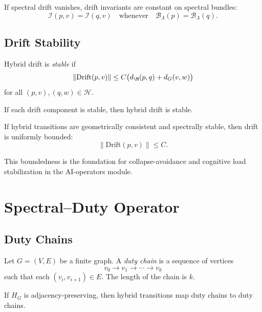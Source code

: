 \begin{theorem}
If spectral drift vanishes, drift invariants are constant on spectral
bundles:
\[
\mathcal{I}(p,v) = \mathcal{I}(q,v)
\quad\text{whenever}\quad
\mathcal{B}_\Lambda(p) = \mathcal{B}_\Lambda(q).
\]
\end{theorem}

\subsection{Drift Stability}

\begin{definition}
Hybrid drift is \emph{stable} if
\[
\|\mathrm{Drift}(p,v)\|
\le C \big( d_\M(p,q) + d_G(v,w) \big)
\]
for all $(p,v),(q,w) \in \mathcal{H}$.
\end{definition}

\begin{lemma}
If each drift component is stable, then hybrid drift is stable.
\end{lemma}

\begin{theorem}
If hybrid transitions are geometrically consistent and spectrally stable,
then drift is uniformly bounded:
\[
\|\mathrm{Drift}(p,v)\| \le C.
\]
\end{theorem}

\begin{remark}
This boundedness is the foundation for collapse-avoidance and cognitive
load stabilization in the AI-operators module.
\end{remark}

\section{Spectral--Duty Operator}

\subsection{Duty Chains}

\begin{definition}
Let $G = (V,E)$ be a finite graph.  
A \emph{duty chain} is a sequence of vertices
\[
v_0 \to v_1 \to \cdots \to v_k
\]
such that each $(v_i, v_{i+1}) \in E$.  
The length of the chain is $k$.
\end{definition}

\begin{lemma}
If $H_G$ is adjacency-preserving, then hybrid transitions map duty chains
to duty chains.
\end{lemma}

